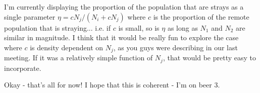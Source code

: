 \documentclass[twocolumn,preprintnumbers,amsmath,amssymb,superscriptaddress]{revtex4}
\begin{document}
I'm currently displaying the proportion of the population that are strays as a single parameter $\eta = cN_j/(N_i+cN_j)$ where $c$ is the proportion of the remote population that is straying... i.e. if $c$ is small, so is $\eta$ as long as $N_1$ and $N_2$ are similar in magnitude.
I think that it would be really fun to explore the case where $c$ is density dependent on $N_j$, as you guys were describing in our last meeting.
If it was a relatively simple function of $N_j$, that would be pretty easy to incorporate.

Okay - that's all for now! I hope that this is coherent - I'm on beer 3.
\end{document}
